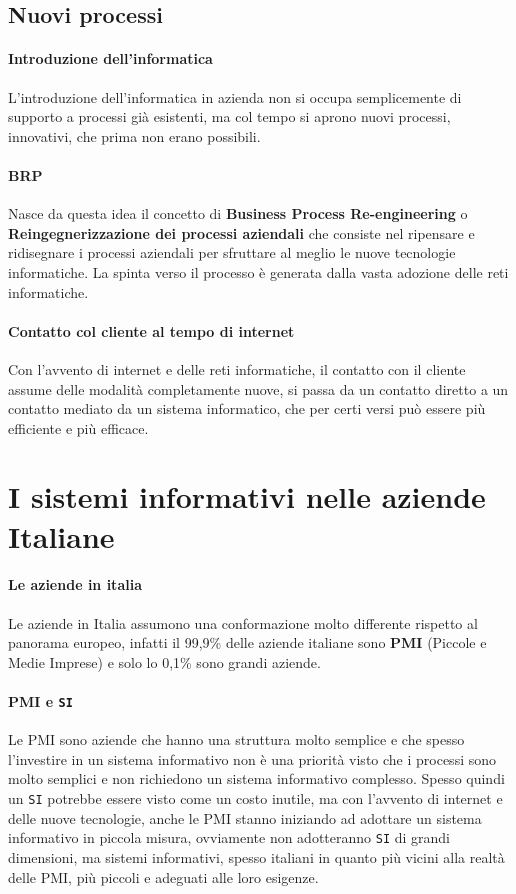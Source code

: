     \subsection{Nuovi processi}
        \paragraph{Introduzione dell'informatica} L'introduzione dell'informatica in azienda non si occupa semplicemente di supporto a processi già esistenti, ma col tempo si aprono nuovi processi, innovativi, che prima non erano possibili.
        \paragraph{BRP} Nasce da questa idea il concetto di \textbf{Business Process Re-engineering} o \textbf{Reingegnerizzazione dei processi aziendali} che consiste nel ripensare e ridisegnare i processi aziendali per sfruttare al meglio le nuove tecnologie informatiche. La spinta verso il processo è generata dalla vasta adozione delle reti informatiche.
        \paragraph{Contatto col cliente al tempo di internet} Con l'avvento di internet e delle reti informatiche, il contatto con il cliente assume delle modalità completamente nuove, si passa da un contatto diretto a un contatto mediato da un sistema informatico, che per certi versi può essere più efficiente e più efficace.
\section{I sistemi informativi nelle aziende Italiane}
    \paragraph{Le aziende in italia} Le aziende in Italia assumono una conformazione molto differente rispetto al panorama europeo, infatti il 99,9\% delle aziende italiane sono \textbf{PMI} (Piccole e Medie Imprese) e solo lo 0,1\% sono grandi aziende.
    \paragraph{PMI e \texttt{SI}} Le PMI sono aziende che hanno una struttura molto semplice e che spesso l'investire in un sistema informativo non è una priorità visto che i processi sono molto semplici e non richiedono un sistema informativo complesso. \newline
    Spesso quindi un \texttt{SI} potrebbe essere visto come un costo inutile, ma con l'avvento di internet e delle nuove tecnologie, anche le PMI stanno iniziando ad adottare un sistema informativo in piccola misura, ovviamente non adotteranno \texttt{SI} di grandi dimensioni, ma sistemi informativi, spesso italiani in quanto più vicini alla realtà delle PMI, più piccoli e adeguati alle loro esigenze.
